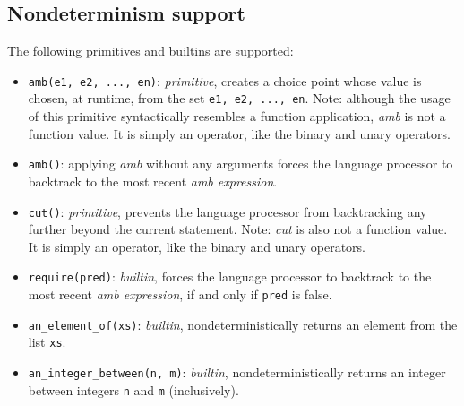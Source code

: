 \subsection*{Nondeterminism support}

The following primitives and builtins are supported:

\begin{itemize}
\item \lstinline{amb(e1, e2, ..., en)}: \textit{primitive}, creates a choice point whose value is chosen, at runtime,
from the set \lstinline{e1, e2, ..., en}. Note: although the usage of this primitive syntactically resembles a function application, \textit{amb} is not a function value. It is simply an operator, like the binary and unary operators.
\item \lstinline{amb()}: applying \textit{amb} without any arguments forces the language processor to backtrack to the most recent \textit{amb expression}.
\item \lstinline{cut()}: \textit{primitive}, prevents the language processor from backtracking any further beyond the current statement. Note: \textit{cut} is also not a function value. It is simply an operator, like the binary and unary operators.
\item \lstinline{require(pred)}: \textit{builtin}, forces the language processor to backtrack to the most recent \textit{amb expression}, if and only if \lstinline{pred} is false.
\item \lstinline{an_element_of(xs)}: \textit{builtin}, nondeterministically returns an element from the list \lstinline{xs}.
\item \lstinline{an_integer_between(n, m)}: \textit{builtin}, nondeterministically returns an integer between integers \lstinline{n} and \lstinline{m} (inclusively).
\end{itemize}
